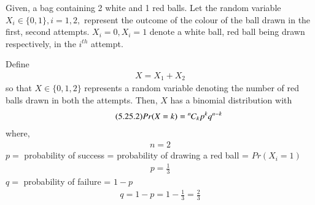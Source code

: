 Given, a bag containing 2 white and 1 red balls. Let the random variable $X_{i}\in\{0,1\},i=1,2,$ represent the outcome of the colour of the ball drawn in the first, second attempts. $X_{i}=0,X_{i}=1$ denote a white ball, red ball being drawn respectively, in the $i^{th}$ attempt.
\begin{comment}
As the ball drawn in the first attempt is replaced in the bag, for both the attempts, the number of balls of a specified colour, and their probability  mass function's (pmf's) remain the same. i.e, 
\begin{align}
    \tag{5.25.1}
    n(X_{i}=0)=2\\
    \tag{5.25.2}
    n(X_{i}=1)=1\\
    \tag{5.25.3}
    \therefore n(X_{i}=0)+n(X_{i}=1)=3 
\end{align}
and
\begin{align}
    \tag{5.25.4}
    \Pr(X_{i}=j) = 
	\begin{cases}
	\dfrac{2}{3}, &j=0 \\~\\[-1em]
	\dfrac{1}{3}, &j=1 \\~\\[-1em]
	0, & otherwise
	\end{cases}
\end{align}
\newpage
\end{comment}
\newline
\newline
Define 
\begin{align}
    \tag{5.25.1}
    X=X_{1}+X_{2}
\end{align}
so that $X\in\{0,1,2\}$ represents a random variable denoting the number of red balls drawn in both the attempts. Then, $X$ has a binomial distribution with 
\begin{align}
    \tag{5.25.2}
    Pr(X=k)={{{}^{n}\mkern-1muC_{k}}}p^{k}q^{n-k}
    \label{5.25:eq:binomialdistr}
\end{align}
where,
\begin{align}
    \tag{5.25.3}
    n=2
\end{align}
$p =$ probability of success = probability of drawing a red ball = $Pr(X_{i}=1)$
\begin{align}
    \tag{5.25.4}
    p=\frac{1}{3}
\end{align}
$q =$ probability of failure = $1-p$
\begin{align}
    \tag{5.25.5}
    q=1-p=1-\frac{1}{3}=\frac{2}{3}
\end{align}
\newline
